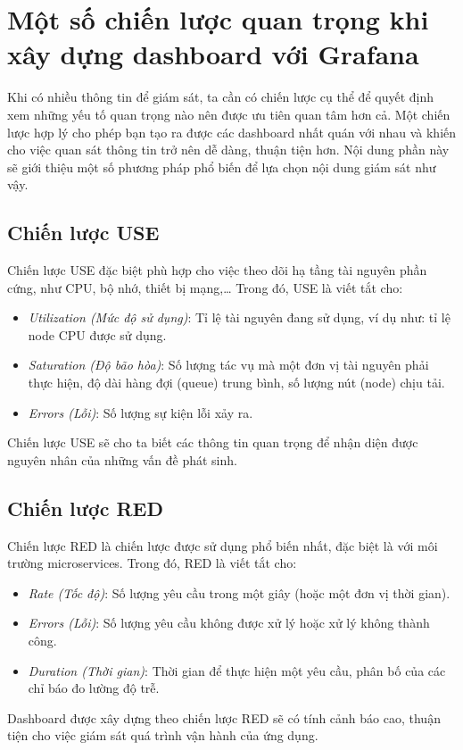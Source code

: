 \section{Một số chiến lược quan trọng khi xây dựng dashboard với Grafana}
Khi có nhiều thông tin để giám sát, ta cần có chiến lược cụ thể để quyết định xem những yếu tố quan trọng nào nên được ưu tiên quan tâm hơn cả. Một chiến lược hợp lý cho phép bạn tạo ra được các dashboard nhất quán với nhau và khiến cho việc quan sát thông tin trở nên dễ dàng, thuận tiện hơn. Nội dung phần này sẽ giới thiệu một số phương pháp phổ biến để lựa chọn nội dung giám sát như vậy.

\subsection{Chiến lược USE}
Chiến lược USE đặc biệt phù hợp cho việc theo dõi hạ tầng tài nguyên phần cứng, như CPU, bộ nhớ, thiết bị mạng,… Trong đó, USE là viết tắt cho:
\begin{itemize}
    \item \textit{Utilization (Mức độ sử dụng)}: Tỉ lệ tài nguyên đang sử dụng, ví dụ như: tỉ lệ node CPU được sử dụng.
    \item \textit{Saturation (Độ bão hòa)}: Số lượng tác vụ mà một đơn vị tài nguyên phải thực hiện, độ dài hàng đợi (queue) trung bình, số lượng nút (node) chịu tải.
    \item \textit{Errors (Lỗi)}: Số lượng sự kiện lỗi xảy ra.
\end{itemize}
Chiến lược USE sẽ cho ta biết các thông tin quan trọng để nhận diện được nguyên nhân của những vấn đề phát sinh. 

\subsection{Chiến lược RED}
Chiến lược RED là chiến lược được sử dụng phổ biến nhất, đặc biệt là với môi trường microservices. Trong đó, RED là viết tắt cho:
\begin{itemize}
    \item \textit{Rate (Tốc độ)}: Số lượng yêu cầu trong một giây (hoặc một đơn vị thời gian).
    \item \textit{Errors (Lỗi)}: Số lượng yêu cầu không được xử lý hoặc xử lý không thành công.
    \item \textit{Duration (Thời gian)}: Thời gian để thực hiện một yêu cầu, phân bố của các chỉ báo đo lường độ trễ.
\end{itemize}
Dashboard được xây dựng theo chiến lược RED sẽ có tính cảnh báo cao, thuận tiện cho việc giám sát quá trình vận hành của ứng dụng. 

